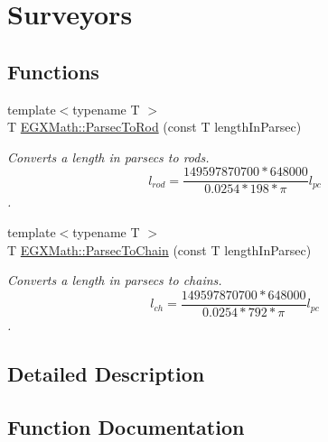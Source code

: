 \hypertarget{group___e_g_x_math-_conversions-_length_conversions-_astronomical-_parsec-_surveyors}{}\section{Surveyors}
\label{group___e_g_x_math-_conversions-_length_conversions-_astronomical-_parsec-_surveyors}
\subsection*{Functions}
\begin{DoxyCompactItemize}
\item 
{\footnotesize template$<$typename T $>$ }\\T \mbox{\hyperlink{group___e_g_x_math-_conversions-_length_conversions-_astronomical-_parsec-_surveyors_gae1b8ed339937e1c769e4617dbe1e70e1}{E\+G\+X\+Math\+::\+Parsec\+To\+Rod}} (const T length\+In\+Parsec)
\begin{DoxyCompactList}\small\item\em Converts a length in parsecs to rods. \[ l_{rod}= \frac{149597870700 * 648000}{0.0254 * 198 * \pi} l_{pc} \]. \end{DoxyCompactList}\item 
{\footnotesize template$<$typename T $>$ }\\T \mbox{\hyperlink{group___e_g_x_math-_conversions-_length_conversions-_astronomical-_parsec-_surveyors_gafe4318e1971a50fd899558ca0e9cf7c6}{E\+G\+X\+Math\+::\+Parsec\+To\+Chain}} (const T length\+In\+Parsec)
\begin{DoxyCompactList}\small\item\em Converts a length in parsecs to chains. \[ l_{ch}= \frac{149597870700 * 648000}{0.0254 * 792 * \pi} l_{pc} \]. \end{DoxyCompactList}\end{DoxyCompactItemize}


\subsection{Detailed Description}


\subsection{Function Documentation}
\mbox{\label{group___e_g_x_math-_conversions-_length_conversions-_astronomical-_parsec-_surveyors_gafe4318e1971a50fd899558ca0e9cf7c6}} 
